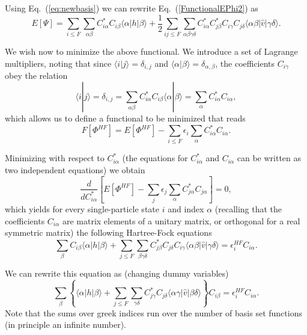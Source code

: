 Using Eq.~(\ref{eq:newbasis}) we can rewrite
Eq.~(\ref{FunctionalEPhi2}) as
\begin{equation}
  E[\Psi] = \sum_{i\le F} \sum_{\alpha\beta}
  C^*_{i\alpha}C_{i\beta}\langle \alpha | h | \beta \rangle +
  \frac{1}{2}\sum_{ij\le F}\sum_{{\alpha\beta\gamma\delta}}
  C^*_{i\alpha}C^*_{j\beta}C_{i\gamma}C_{j\delta}\langle
  \alpha\beta|\hat{v}|\gamma\delta\rangle. \label{FunctionalEPhi3}
\end{equation}


We wish now to minimize the above functional. We introduce a set of
Lagrange multipliers, noting that since $\langle i | j \rangle =
\delta_{i,j}$ and $\langle \alpha | \beta \rangle =
\delta_{\alpha,\beta}$, the coefficients $C_{i\gamma}$ obey the
relation
\[
 \langle i | j \rangle=\delta_{i,j}=\sum_{\alpha\beta}
 C^*_{i\alpha}C_{i\beta}\langle \alpha | \beta \rangle= \sum_{\alpha}
 C^*_{i\alpha}C_{i\alpha},
\]
which allows us to define a functional to be minimized that reads
\begin{equation}
  F[\Phi^{HF}]=E[\Phi^{HF}] - \sum_{i\le F}\epsilon_i\sum_{\alpha}
  C^*_{i\alpha}C_{i\alpha}.
\end{equation}


Minimizing with respect to $C^*_{i\alpha}$ (the equations for
$C^*_{i\alpha}$ and $C_{i\alpha}$ can be written as two independent
equations) we obtain
\[
\frac{d}{dC^*_{i\alpha}}\left[ E[\Phi^{HF}] -
  \sum_{j}\epsilon_j\sum_{\alpha} C^*_{j\alpha}C_{j\alpha}\right]=0,
\]
which yields for every single-particle state $i$ and index $\alpha$
(recalling that the coefficients $C_{i\alpha}$ are matrix elements of
a unitary matrix, or orthogonal for a real symmetric matrix) the
following Hartree-Fock equations
\[
\sum_{\beta} C_{i\beta}\langle \alpha | h | \beta \rangle+
\sum_{j\le F}\sum_{\beta\gamma\delta}
C^*_{j\beta}C_{j\delta}C_{i\gamma}\langle
\alpha\beta|\hat{v}|\gamma\delta\rangle=\epsilon_i^{HF}C_{i\alpha}.
\]


We can rewrite this equation as (changing dummy variables)
\[
\sum_{\beta} \left\{\langle \alpha | h | \beta \rangle+
\sum_{j\le F}\sum_{\gamma\delta} C^*_{j\gamma}C_{j\delta}\langle
\alpha\gamma|\hat{v}|\beta\delta\rangle\right\}C_{i\beta}=\epsilon_i^{HF}C_{i\alpha}.
\]
Note that the sums over greek indices run over the number of basis set
functions (in principle an infinite number).

